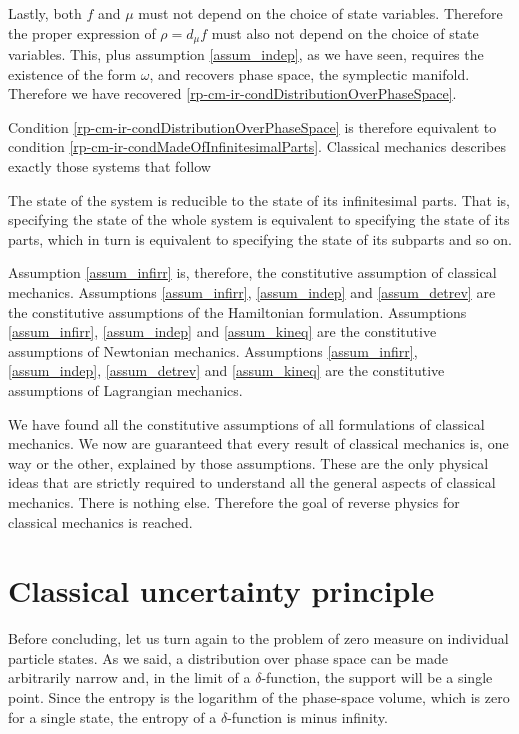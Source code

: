 Lastly, both $f$ and $\mu$ must not depend on the choice of state variables. Therefore the proper expression of $\rho = d_{\mu} f$ must also not depend on the choice of state variables. This, plus assumption \ref{assum_indep}, as we have seen, requires the existence of the form $\omega$, and recovers phase space, the symplectic manifold. Therefore we have recovered \ref{rp-cm-ir-condDistributionOverPhaseSpace}.

Condition \ref{rp-cm-ir-condDistributionOverPhaseSpace} is therefore equivalent to condition \ref{rp-cm-ir-condMadeOfInfinitesimalParts}. Classical mechanics describes exactly those systems that follow
\renewcommand{\theassump}{IR}
\begin{assump}\label{assum_infirr}
	The state of the system is reducible to the state of its infinitesimal parts. That is, specifying the state of the whole system is equivalent to specifying the state of its parts, which in turn is equivalent to specifying the state of its subparts and so on.
\end{assump}
\renewcommand{\theassump}{\Roman{assump}}
Assumption \ref{assum_infirr} is, therefore, the constitutive assumption of classical mechanics. Assumptions \ref{assum_infirr}, \ref{assum_indep} and \ref{assum_detrev} are the constitutive assumptions of the Hamiltonian formulation. Assumptions \ref{assum_infirr}, \ref{assum_indep} and \ref{assum_kineq} are the constitutive assumptions of Newtonian mechanics.  Assumptions \ref{assum_infirr}, \ref{assum_indep}, \ref{assum_detrev} and \ref{assum_kineq} are the constitutive assumptions of Lagrangian mechanics. 

We have found all the constitutive assumptions of all formulations of classical mechanics. We now are guaranteed that every result of classical mechanics is, one way or the other, explained by those assumptions. These are the only physical ideas that are strictly required to understand all the general aspects of classical mechanics. There is nothing else. Therefore the goal of reverse physics for classical mechanics is reached.

\section{Classical uncertainty principle}\label{rp-cm-sec-classicalUncertaintyPrinciple}

Before concluding, let us turn again to the problem of zero measure on individual particle states. As we said, a distribution over phase space can be made arbitrarily narrow and, in the limit of a $\delta$-function, the support will be a single point. Since the entropy is the logarithm of the phase-space volume, which is zero for a single state, the entropy of a $\delta$-function is minus infinity.

